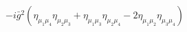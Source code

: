 %
\begin{dmath*}
%
  -  i {\bar g}{}^2 \left(\eta_{\mu_1 \mu_4} \eta_{\mu_2 \mu_3} + \eta_{\mu_1 \mu_3} \eta_{\mu_2 \mu_4} - 2 \eta_{\mu_1 \mu_2} \eta_{\mu_3 \mu_4}\right)
%
\end{dmath*}
%
